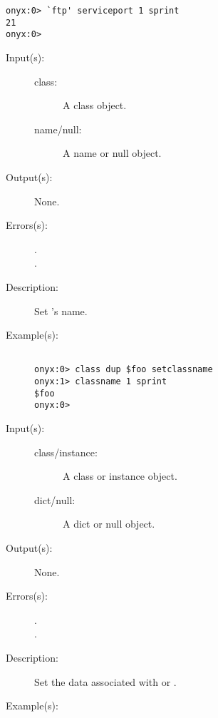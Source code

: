 \begin{description}
\begin{description}
\begin{verbatim}
onyx:0> `ftp' serviceport 1 sprint
21
onyx:0>
		\end{verbatim}
	\end{description}
\label{systemdict:setclassname}
\item[{\onyxop{class name/null}{setclassname}{--}}: ]
	\begin{description}\item[]
	\item[Input(s): ]
		\begin{description}\item[]
		\item[class: ]
			A class object.
		\item[name/null: ]
			A name or null object.
		\end{description}
	\item[Output(s): ] None.
	\item[Errors(s): ]
		\begin{description}\item[]
		\item[.]
		\item[.]
		\end{description}
	\item[Description: ]
		Set 's name.
	\item[Example(s): ]\begin{verbatim}

onyx:0> class dup $foo setclassname
onyx:1> classname 1 sprint
$foo
onyx:0>
		\end{verbatim}
	\end{description}
\label{systemdict:setdata}
\item[{\onyxop{class/instance dict/null}{setdata}{--}}: ]
	\begin{description}\item[]
	\item[Input(s): ]
		\begin{description}\item[]
		\item[class/instance: ]
			A class or instance object.
		\item[dict/null: ]
			A dict or null object.
		\end{description}
	\item[Output(s): ] None.
	\item[Errors(s): ]
		\begin{description}\item[]
		\item[.]
		\item[.]
		\end{description}
	\item[Description: ]
		Set the data associated with  or .
	\item[Example(s): ]\begin{verbatim}


\end{verbatim}
\end{description}
\end{description}
